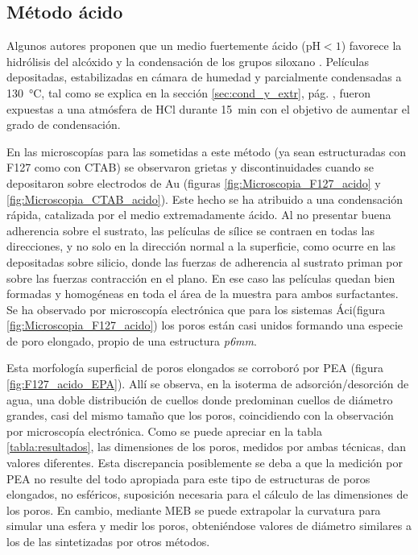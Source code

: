 	 \subsection{Método ácido}

	 	 Algunos autores proponen que un medio fuertemente ácido (pH$<1$) favorece la hidrólisis del alcóxido y la condensación de los grupos siloxano \cite{Soler-Illia2011,Doshi2000a,Huo1996,Boissiere2000,Beck1992}. Películas depositadas, estabilizadas en cámara de humedad y parcialmente condensadas a \SI{130}{\celsius}, tal como se explica en la sección \ref{sec:cond_y_extr}, pág. \pageref{sec:cond_y_extr}, fueron expuestas a una atmósfera de HCl durante \SI{15}{\minute} con el objetivo de aumentar el grado de condensación. 

		 En las microscopías para las \pdm\space sometidas a este método (ya sean estructuradas con F127 como con CTAB) se observaron grietas y discontinuidades cuando se depositaron sobre electrodos de Au (figuras \ref{fig:Microscopia_F127_acido} y \ref{fig:Microscopia_CTAB_acido}). Este hecho se ha atribuido a una condensación rápida, catalizada por el medio extremadamente ácido. Al no presentar buena adherencia sobre el sustrato, las películas de sílice se contraen en todas las direcciones, y no solo en la dirección normal a la superficie, como ocurre en las \pdm\space depositadas sobre silicio, donde las fuerzas de adherencia al sustrato priman por sobre las fuerzas contracción en el plano\cite{Sakatani2006,Boissiere2005,Guillemin2010}. En ese caso las películas quedan bien formadas y homogéneas en toda el área de la muestra para ambos surfactantes. Se ha observado por microscopía electrónica que para los sistemas Áci\pdmF\space (figura \ref{fig:Microscopia_F127_acido}) los  poros están casi unidos formando una especie de poro elongado, propio de una estructura \textit{p6mm}\cite{GonzalezSolveyra2017}. 
	
		 Esta morfología superficial de poros elongados se corroboró por PEA (figura \ref{fig:F127_acido_EPA}). Allí se observa, en la isoterma de adsorción/desorción de agua, una doble distribución de cuellos donde predominan cuellos de diámetro grandes, casi del mismo tamaño que los poros, coincidiendo con la observación por microscopía electrónica.
		 Como se puede apreciar en la tabla \ref{tabla:resultados}, las dimensiones de los poros, medidos por ambas técnicas, dan valores diferentes. Esta discrepancia posiblemente se deba a que la medición por PEA no resulte del todo apropiada para este tipo de estructuras de poros elongados, no esféricos, suposición necesaria para el cálculo de las dimensiones de los poros. En cambio, mediante MEB se puede extrapolar la curvatura para simular una esfera y medir los poros, obteniéndose valores de diámetro similares a los de las \pdmF\space sintetizadas por otros métodos.

